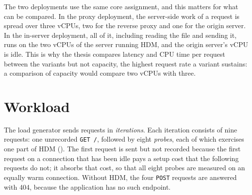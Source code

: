 \documentclass{rptuma}
\begin{document}
The two deployments use the same core assignment, and this matters for what can be compared. In the
proxy deployment, the server-side work of a request is spread over three vCPUs, two for the reverse
proxy and one for the origin server. In the in-server deployment, all of it, including reading the
file and sending it, runs on the two vCPUs of the server running HDM, and the origin server's vCPU is idle.
This is why the thesis compares latency and CPU time per request between the variants but not
capacity, the highest request rate a variant sustains: a comparison of capacity would compare two
vCPUs with three.

\section{Workload}
\label{sec:method.workload}

The load generator sends requests in \emph{iterations}. Each iteration consists of nine requests: one
unrecorded \texttt{GET /}, followed by eight \emph{probes}, each of which exercises one part of HDM
(). The first request is sent but not recorded because the first
request on a connection that has been idle pays a setup cost that the following requests do not;
it absorbs that cost, so that all eight probes are measured on an equally warm connection. Without HDM, the four \texttt{POST} requests are answered with 404,
because the application has no such endpoint.
\end{document}
